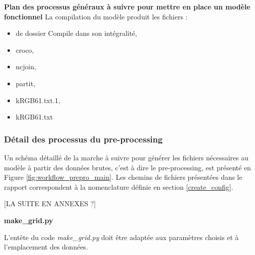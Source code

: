 \documentclass[10pt,a4paper,titlepage]{article}
\begin{document}
\begin{processEnv}{\textbf{Plan des processus généraux à suivre pour mettre en place un modèle fonctionnel}}
    La compilation du modèle produit les fichiers :

    \begin{itemize}
        \item de dossier Compile dans son intégralité,
        \item croco,
        \item ncjoin,
        \item partit,
        \item kRGB61.txt.1,
        \item kRGB61.txt
    \end{itemize}

\end{processEnv}

\subsubsection{Détail des processus du pre-processing}
Un schéma détaillé de la marche à suivre pour générer les fichiers nécessaires au modèle à partir des données brutes, c'est à dire le pre-processing, est présenté en Figure \ref{fig:workflow_prepro_main}.
Les chemins de fichiers présentées dans le rapport correspondent à la nomenclature définie en section \ref{create_config}.


[LA SUITE EN ANNEXES ?]

\textbf{make\_grid.py}

L'entête du code \textit{make\_grid.py} doit être adaptée aux paramètres choisis et à l'emplacement des données.
\end{document}
